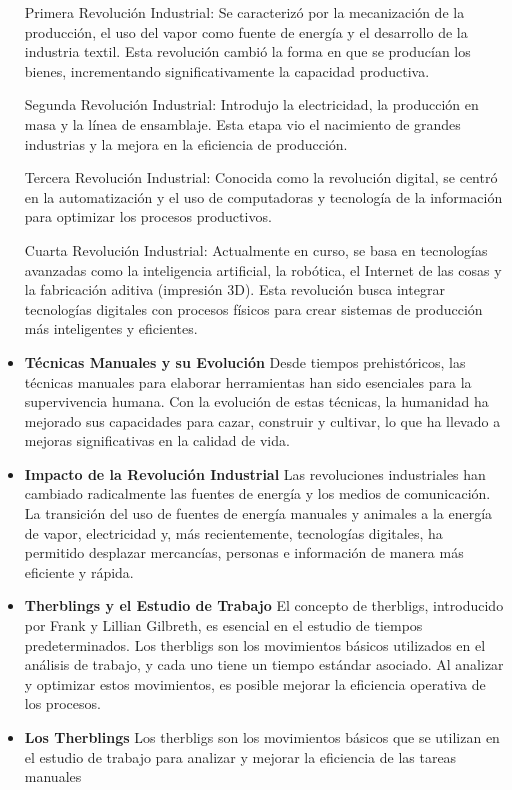\begin{itemize}
    Primera Revolución Industrial: Se caracterizó por la mecanización de la producción, el uso del vapor como fuente de energía y el desarrollo de la industria textil. Esta revolución cambió la forma en que se producían los bienes, incrementando significativamente la capacidad productiva.
    
    Segunda Revolución Industrial: Introdujo la electricidad, la producción en masa y la línea de ensamblaje. Esta etapa vio el nacimiento de grandes industrias y la mejora en la eficiencia de producción.
    
    Tercera Revolución Industrial: Conocida como la revolución digital, se centró en la automatización y el uso de computadoras y tecnología de la información para optimizar los procesos productivos.
    
    Cuarta Revolución Industrial: Actualmente en curso, se basa en tecnologías avanzadas como la inteligencia artificial, la robótica, el Internet de las cosas y la fabricación aditiva (impresión 3D). Esta revolución busca integrar tecnologías digitales con procesos físicos para crear sistemas de producción más inteligentes y eficientes.\cite{bock}
    
    \item \textbf{Técnicas Manuales y su Evolución}
    Desde tiempos prehistóricos, las técnicas manuales para elaborar herramientas han sido esenciales para la supervivencia humana. Con la evolución de estas técnicas, la humanidad ha mejorado sus capacidades para cazar, construir y cultivar, lo que ha llevado a mejoras significativas en la calidad de vida.
    \item \textbf{Impacto de la Revolución Industrial}
    Las revoluciones industriales han cambiado radicalmente las fuentes de energía y los medios de comunicación. La transición del uso de fuentes de energía manuales y animales a la energía de vapor, electricidad y, más recientemente, tecnologías digitales, ha permitido desplazar mercancías, personas e información de manera más eficiente y rápida.\cite{karube}
    \item \textbf{Therblings y el Estudio de Trabajo}
    El concepto de therbligs, introducido por Frank y Lillian Gilbreth, es esencial en el estudio de tiempos predeterminados. Los therbligs son los movimientos básicos utilizados en el análisis de trabajo, y cada uno tiene un tiempo estándar asociado. Al analizar y optimizar estos movimientos, es posible mejorar la eficiencia operativa de los procesos.
    
    \item \textbf{Los Therblings}
    Los therbligs son los movimientos básicos que se utilizan en el estudio de trabajo para analizar y mejorar la eficiencia de las tareas manuales
    

\end{itemize}
